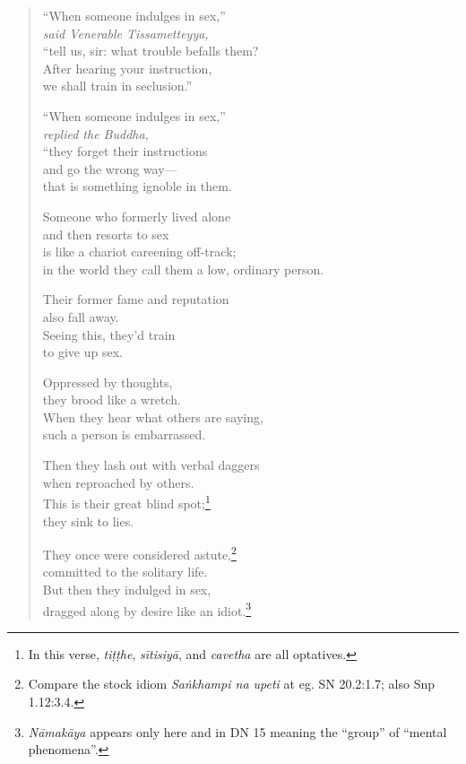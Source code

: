 \documentclass[12pt,openany]{book}%
\newcommand*{\scspeaker}[1]{\hspace{2em}\textit{#1}}
\begin{document}
\begin{verse}%
“When someone indulges in sex,” \\
\scspeaker{said Venerable Tissametteyya, }\\
“tell us, sir: what trouble befalls them? \\
After hearing your instruction, \\
we shall train in seclusion.” 

“When someone indulges in sex,” \\
\scspeaker{replied the Buddha, }\\
“they forget their instructions \\
and go the wrong way—\\
that is something ignoble in them. 

Someone who formerly lived alone \\
and then resorts to sex \\
is like a chariot careening off-track; \\
in the world they call them a low, ordinary person. 

Their former fame and reputation \\
also fall away. \\
Seeing this, they’d train \\
to give up sex. 

Oppressed by thoughts, \\
they brood like a wretch. \\
When they hear what others are saying, \\
such a person is embarrassed. 

Then they lash out with verbal daggers \\
when reproached by others. \\
This is their great blind spot;\footnote{In this verse, \textit{\textsanskrit{tiṭṭhe}}, \textit{\textsanskrit{sītisiyā}}, and \textit{cavetha} are all optatives. } \\
they sink to lies. 

They once were considered astute,\footnote{Compare the stock idiom \textit{\textsanskrit{Saṅkhampi} na upeti} at eg. SN 20.2:1.7; also Snp 1.12:3.4. } \\
committed to the solitary life. \\
But then they indulged in sex, \\
dragged along by desire like an idiot.\footnote{\textit{\textsanskrit{Nāmakāya}} appears only here and in DN 15 meaning the “group” of “mental phenomena”. } 


\end{verse}
\end{document}
